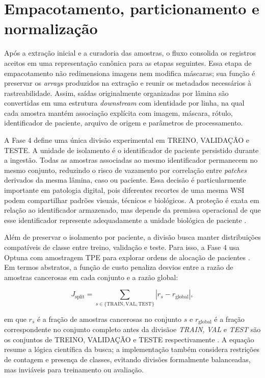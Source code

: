 \section{Empacotamento, particionamento e normalização}
\label{sec:met_particionamento_normalizacao}

Após a extração inicial e a curadoria das amostras, o fluxo consolida os
registros aceitos em uma representação canônica para as etapas seguintes. Essa
etapa de empacotamento não redimensiona imagens nem modifica máscaras; sua
função é preservar os \textit{arrays} produzidos na extração e reunir os metadados
necessários à rastreabilidade. Assim, saídas originalmente organizadas por
lâmina são convertidas em uma estrutura \textit{downstream} com identidade por linha,
na qual cada amostra mantém associação explícita com imagem, máscara, rótulo,
identificador de paciente, arquivo de origem e parâmetros de processamento.

A Fase 4 define uma única divisão experimental em TREINO,
VALIDAÇÃO e TESTE. A unidade de isolamento é o identificador
de paciente persistido durante a ingestão. Todas as amostras associadas ao mesmo
identificador permanecem no mesmo conjunto, reduzindo o risco de vazamento por
correlação entre \textit{patches} derivados da mesma lâmina, caso ou paciente.
Essa decisão é particularmente importante em patologia digital, pois diferentes
recortes de uma mesma WSI podem compartilhar padrões visuais, técnicos e
biológicos. A proteção é exata em relação ao identificador armazenado, mas
depende da premissa operacional de que esse identificador represente
adequadamente a unidade biológica de paciente
\cite{roberts2017crossvalidation,dawood2026confounding}.

Além de preservar o isolamento por paciente, a divisão busca manter distribuições
compatíveis de classe entre treino, validação e teste. Para isso, a Fase 4 usa
Optuna com amostragem TPE para explorar ordens de alocação de pacientes
\cite{akiba2019optuna,bergstra2011algorithms}. Em termos abstratos, a função de
custo penaliza desvios entre a razão de amostras cancerosas em cada conjunto e a
razão global:

\begin{equation}
    J_{\mathrm{split}} =
    \sum_{s \in \{\mathrm{TRAIN},\mathrm{VAL},\mathrm{TEST}\}}
    \left| r_s - r_{\mathrm{global}} \right| ,
    \label{eq:split_objective}
\end{equation}

em que $r_s$ é a fração de amostras cancerosas no conjunto $s$ e
$r_{\mathrm{global}}$ é a fração correspondente no conjunto completo antes da
divisãoe \textit{TRAIN}, \textit{VAL} e \textit{TEST} são os conjuntos de TREINO, VALIDAÇÃO e TESTE respectivamente . A equação resume a lógica científica da busca; a implementação também
considera restrições de contagem e presença de classes, evitando divisões
formalmente balanceadas, mas inviáveis para treinamento ou avaliação.


